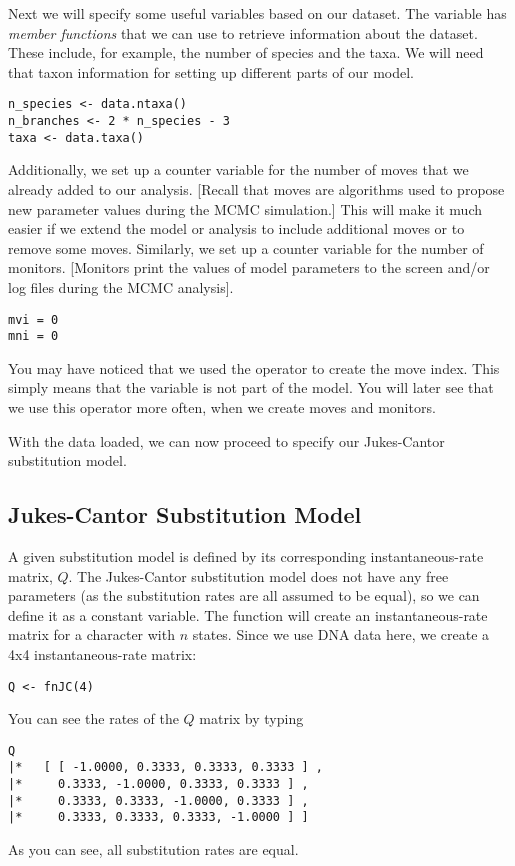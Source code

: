 Next we will specify some useful variables based on our dataset. The variable  has \emph{member functions} that we can use to retrieve information about the dataset. 
These include, for example, the number of species and the taxa.
We will need that taxon information for setting up different parts of our model.
{\tt \begin{snugshade*}
\begin{lstlisting}
n_species <- data.ntaxa()
n_branches <- 2 * n_species - 3
taxa <- data.taxa()
\end{lstlisting}
\end{snugshade*}}

Additionally, we set up a counter variable for the number of moves that we already added to our analysis.
[Recall that moves are algorithms used to propose new parameter values during the MCMC simulation.]
This will make it much easier if we extend the model or analysis to include additional moves or to remove some moves.
Similarly, we set up a counter variable for the number of monitors. 
[Monitors print the values of model parameters to the screen and/or log files during the MCMC analysis].
{\tt \begin{snugshade*}
\begin{lstlisting}
mvi = 0 
mni = 0
\end{lstlisting}
\end{snugshade*}}
You may have noticed that we used the \cl{=} operator to create the move index.
This simply means that the variable is not part of the model.
You will later see that we use this operator more often, \EG when we create moves and monitors.

With the data loaded, we can now proceed to specify our Jukes-Cantor substitution model.

\subsection{Jukes-Cantor Substitution Model}

A given substitution model is defined by its corresponding instantaneous-rate matrix, $Q$.
The Jukes-Cantor substitution model does not have any free parameters (as the substitution rates are all assumed to be equal), so we can define it as a constant variable.
The function  will create an instantaneous-rate matrix for a character with $n$ states.
Since we use DNA data here, we create a 4x4 instantaneous-rate matrix:
{\tt \begin{snugshade*}
\begin{lstlisting}
Q <- fnJC(4) 
\end{lstlisting}
\end{snugshade*}}
You can see the rates of the $Q$ matrix by typing
{\tt \begin{snugshade*}
\begin{lstlisting}
Q
|*   [ [ -1.0000, 0.3333, 0.3333, 0.3333 ] ,
|*     0.3333, -1.0000, 0.3333, 0.3333 ] ,
|*     0.3333, 0.3333, -1.0000, 0.3333 ] ,
|*     0.3333, 0.3333, 0.3333, -1.0000 ] ]
\end{lstlisting}
\end{snugshade*}}
As you can see, all substitution rates are equal.


